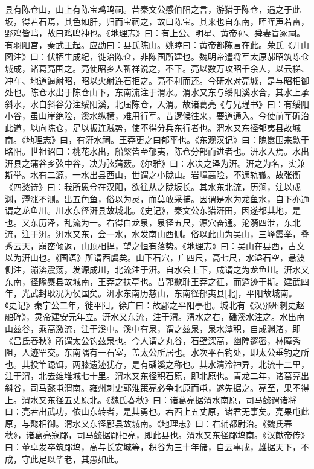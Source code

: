 \documentclass[12pt,UTF8]{ctexbook}
\begin{document}
县有陈仓山，山上有陈宝鸡鸣祠。昔秦文公感伯阳之言，游猎于陈仓，遇之于此坂，得若石焉，其色如肝，归而宝祠之，故曰陈宝。其来也自东南，晖晖声若雷，野鸡皆鸣，故曰鸡鸣神也。《地理志》曰：有上公、明星、黄帝孙、舜妻盲冢祠。有羽阳宫，秦武王起。应劭曰：县氏陈山。姚睦曰：黄帝都陈言在此。荣氏《开山图注》曰：伏牺生成纪，徙治陈仓，非陈国所建也。魏明帝遣将军太原郝昭筑陈仓城成，诸葛亮围之。亮使昭乡人靳祥说之，不下。亮以数万攻昭千余人，以云梯、冲车、地道逼射昭，昭以火射连石拒之。亮不利而还。今研水对亮城，是与昭相御处也。陈仓水出于陈仓山下，东南流注于渭水。渭水又东与绥阳溪水合，其水上承斜水，水自斜谷分注绥阳溪，北届陈仓，入渭。故诸葛亮《与兄瑾书》曰：有绥阳小谷，虽山崖绝险，溪水纵横，难用行军。昔逻候往来，要道通入。今使前军斫治此道，以向陈仓，足以扳连贼势，使不得分兵东行者也。渭水又东径郁夷县故城南。《地理志》曰，有汧水祠。王莽更之曰郁平也。《东观汉记》曰：隗嚣围来歙于略阳。世祖诏曰：桃花水出，船槃皆至郁夷，陈仓分部而进者也。汧水入焉。水出汧县之蒲谷乡弦中谷，决为弦蒲薮。《尔雅》曰：水决之泽为汧。汧之为名，实兼斯举。水有二源，一水出县西山，世谓之小陇山。岩嶂高险，不通轨辙。故张衡《四愁诗》曰：我所恩兮在汉阳，欲往从之陇坂长。其水东北流，历涧，注以成渊，潭涨不测。出五色鱼，俗以为灵，而莫敢采捕。因谓是水为龙鱼水，自下亦通谓之龙鱼川。川水东径汧县故城北。《史记》，秦文公东猎汧田，因遂都其地，是也。又东历泽，乱流为一。右得白龙泉，泉径五尺，源穴奋通。沦漪四泄，东北流，注于汧。汧水又东，会一水，水发南山西侧。俗以此山为吴山，三峰霞举，叠秀云天，崩峦倾返，山顶相捍，望之恒有落势。《地理志》曰：吴山在县西，古文以为汧山也。《国语》所谓西虞矣。山下石穴，广四尺，高七尺，水溢石空，悬波侧注，漰渀震荡，发源成川，北流注于汧。自水会上下，咸谓之为龙鱼川。汧水又东南，径隃麋县故城南，王莽之扶亭也。昔郭歙耻王莽之征，而遁迹于斯。建武四年，光武封耿况为侯国矣。汧水东南历慈山，东南径郁夷县[北]，平阳故城南。《史记》秦宁公二年，徙平阳。徐广曰：故郿之平阳亭也。城北有《汉邠州刺史赵融碑》，灵帝建安元年立。汧水又东流，注于渭。渭水之右，磻溪水注之。水出南山兹谷，乘高激流，注于溪中。溪中有泉，谓之兹泉，泉水潭积，自成渊渚，即《吕氏春秋》所谓太公钓兹泉也。今人谓之丸谷，石壁深高，幽隍邃密，林障秀阻，人迹罕交。东南隅有一石室，盖太公所居也。水次平石钓处，即太公垂钓之所也。其投竿跽饵，两膝遗迹犹存，是有磻溪之称也。其水清泠神异，北流十二里，注于渭，北去维堆城七十里。渭水又东径积石原，即北原也。青龙二年，诸葛亮出斜谷，司马懿屯渭南。雍州刺史郭淮策亮必争北原而屯，遂先据之。亮至，果不得上。渭水又东径五丈原北。《魏氏春秋》曰：诸葛亮据渭水南原，司马懿谓诸将曰：亮若出武功，依山东转者，是其勇也。若西上五丈原，诸君无事矣。亮果屯此原，与懿相御。渭水又东径郿县故城南。《地理志》曰：右辅都尉治。《魏氏春秋》，诸葛亮寇郿，司马懿据郿拒亮，即此县也。渭水又东径郿坞南。《汉献帝传》曰：董卓发卒筑郿坞，高与长安城等，积谷为三十年储，自云事成，雄据天下，不成，守此足以毕老，其愚如此。
\end{document}
